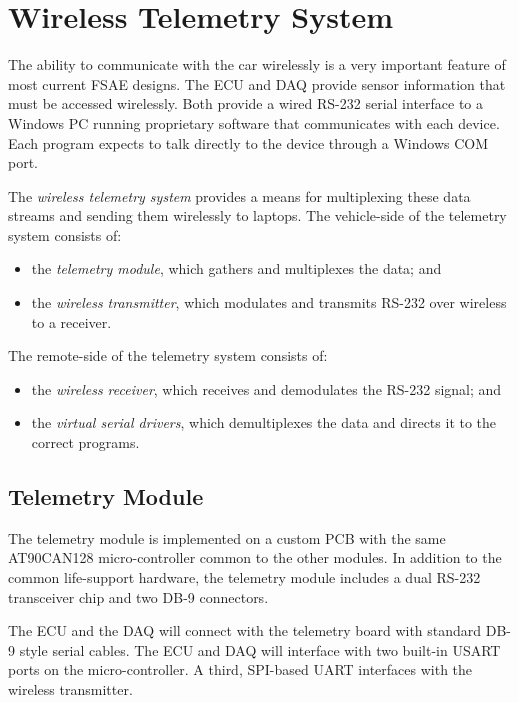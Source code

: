 %
%

\section{Wireless Telemetry System}
\label{wireless_telemetry_system}

The ability to communicate with the car wirelessly is a very important feature of most current FSAE designs. The ECU and DAQ provide sensor information that must be accessed wirelessly. Both provide a wired RS-232 serial interface to a Windows PC running proprietary software that communicates with each device. Each program expects to talk directly to the device through a Windows COM port.

The \emph{wireless telemetry system} provides a means for multiplexing these data streams and sending them wirelessly to laptops. The vehicle-side of the telemetry system consists of:

\begin{itemize}
\item the \emph{telemetry module}, which gathers and multiplexes the data; and
\item the \emph{wireless transmitter}, which modulates and transmits RS-232 over wireless to a receiver.
\end{itemize}

The remote-side of the telemetry system consists of:

\begin{itemize}
\item the \emph{wireless receiver}, which receives and demodulates the RS-232 signal; and
\item the \emph{virtual serial drivers}, which demultiplexes the data and directs it to the correct programs.
\end{itemize}

\subsection{Telemetry Module}

The telemetry module is implemented on a custom PCB with the same AT90CAN128 micro-controller common to the other modules. In addition to the common life-support hardware, the telemetry module includes a dual RS-232 transceiver chip and two DB-9 connectors. 

The ECU and the DAQ will connect with the telemetry board with standard DB-9 style serial cables. The ECU and DAQ will interface with two built-in USART ports on the micro-controller. A third, SPI-based UART interfaces with the wireless transmitter. 

